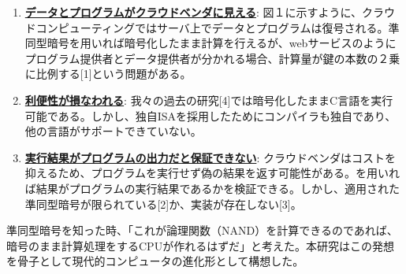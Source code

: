 \begin{enumerate}[label=(\roman*),leftmargin=0.5cm]
\setlength{\parskip}{0cm} %
\setlength{\itemsep}{0cm} %
    \item \underline{\textbf{データとプログラムがクラウドベンダに見える}}: 図１に示すように、クラウドコンピューティングではサーバ上でデータとプログラムは復号される。準同型暗号を用いれば暗号化したまま計算を行えるが、webサービスのようにプログラム提供者とデータ提供者が分かれる場合、計算量が鍵の本数の２乗に比例する[1]という問題がある。\label{prob:maliciousvender}
    \item  \underline{\textbf{利便性が損なわれる}}: 我々の過去の研究[4]では暗号化したままC言語を実行可能である。しかし、独自ISAを採用したためにコンパイラも独自であり、他の言語がサポートできていない。\label{prob:usability}
    \item  \underline{\textbf{実行結果がプログラムの出力だと保証できない}}: クラウドベンダはコストを抑えるため、プログラムを実行せず偽の結果を返す可能性がある。を用いれば結果がプログラムの実行結果であるかを検証できる。しかし、適用された準同型暗号が限られている[2]か、実装が存在しない[3]。\label{prob:verifiability}
\end{enumerate}


準同型暗号を知った時、「これが論理関数（NAND）を計算できるのであれば、暗号のまま計算処理をするCPUが作れるはずだ」と考えた。本研究はこの発想を骨子として現代的コンピュータの進化形として構想した。




